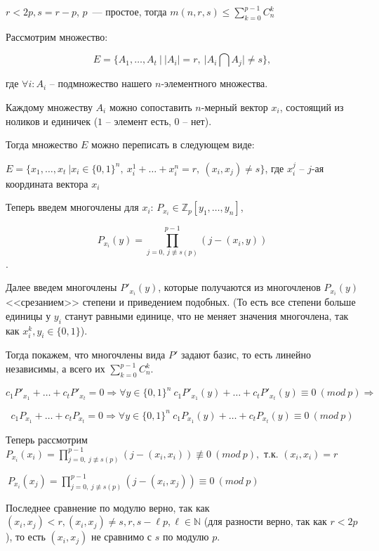 \Th $r < 2p, s = r - p$, $p$~--- простое, тогда $m(n, r, s) \leq \sum\limits_{k = 0}^{p - 1}C_n^k$

\Proof Рассмотрим множество:

$$
E = \{A_1, \ldots, A_t \ | \ |A_i| = r, \ |A_i \bigcap A_j| \ne s\},
$$ 

где $\forall i: A_i$ -- подмножество нашего $n$-элементного множества.

Каждому множеству $A_i$ можно сопоставить $n$-мерный вектор $x_i$, состоящий из ноликов и единичек ($1$ -- элемент есть, $0$ -- нет).

Тогда множество $E$ можно переписать в следующем виде:

$E = \{x_1, \ldots, x_t \ | x_i \in \{0, 1\}^n, \ x_i^1 + \ldots + x_i^n = r, \ (x_i, x_j) \ne s\}$, где $x_i^j$ -- $j$-ая координата вектора $x_i$

Теперь введем многочлены для $x_i$:
$P_{x_i} \in \mathbb{Z}_p[y_1, \ldots, y_n]$, 

$$P_{x_i}(y) = \prod_{j = 0, \ j \not\equiv s (p)}^{p - 1}(j - (x_i, y))$$.

Далее введем многочлены $P'_{x_i}(y)$, которые получаются из многочленов $P_{x_i}(y)$ <<срезанием>> степени и приведением подобных. (То есть все степени больше единицы у $y_i$ станут равными единице, что не меняет значения многочлена, так как $x_i^k, y_i \in \{0, 1\}$).

Тогда покажем, что многочлены вида $P'$ задают базис, то есть линейно независимы, а всего их $\sum\limits_{k = 0}^{p - 1}C_n^k$.

$$
c_1 P'_{x_1} + \ldots + c_t P'_{x_t} = 0 \Longrightarrow \forall y \in \{0, 1\}^n \ c_1 P'_{x_1}(y) + \ldots + c_t P'_{x_t}(y) \equiv 0 \ (mod \ p) \Longrightarrow
$$

$$
c_1 P_{x_1} + \ldots + c_t P_{x_t} = 0 \Longrightarrow \forall y \in \{0, 1\}^n \ c_1 P_{x_1}(y) + \ldots + c_t P_{x_t}(y) \equiv 0 \ (mod \ p)
$$

Теперь рассмотрим\\

$P_{x_i}(x_i) = \prod\limits_{j = 0, \ j \not\equiv s (p)}^{p - 1}(j - (x_i, x_i)) \not\equiv 0 \ (mod \ p),$ т.к. $(x_i, x_i) = r$\

$\ P_{x_i}(x_j) = \prod\limits_{j = 0, \ j \not\equiv s (p)}^{p - 1}(j - (x_i, x_j)) \equiv 0 \ (mod \ p)
$

Последнее сравнение по модулю верно, так как $(x_i, x_j) < r, (x_i, x_j) \ne s, r, s - \ell p, \ell \in \mathbb{N}$ (для разности верно, так как $r < 2p$), то есть $(x_i, x_j)$ не сравнимо с $s$ по модулю $p$.

